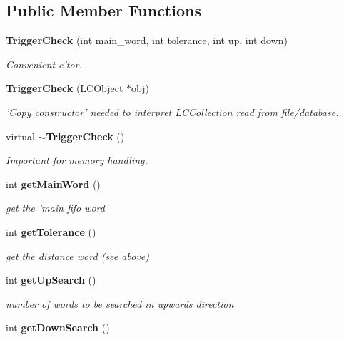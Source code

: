 \subsection*{Public Member Functions}
\begin{DoxyCompactItemize}
\item 
{\bf Trigger\-Check} (int main\-\_\-word, int tolerance, int up, int down)\label{classCALICE_1_1TriggerCheck_a5c6ad83c6479b1155434bd966137761e}

\begin{DoxyCompactList}\small\item\em Convenient c'tor. \end{DoxyCompactList}\item 
{\bf Trigger\-Check} (L\-C\-Object $\ast$obj)\label{classCALICE_1_1TriggerCheck_a212c6fc6145b9283fabe58679d934f74}

\begin{DoxyCompactList}\small\item\em 'Copy constructor' needed to interpret L\-C\-Collection read from file/database. \end{DoxyCompactList}\item 
virtual {\bf $\sim$\-Trigger\-Check} ()\label{classCALICE_1_1TriggerCheck_afcadb8b8d10fb40e64ec9656e1984e01}

\begin{DoxyCompactList}\small\item\em Important for memory handling. \end{DoxyCompactList}\item 
int {\bf get\-Main\-Word} ()\label{classCALICE_1_1TriggerCheck_a3f9131b5775e8b27f6808f0e3b93acbb}

\begin{DoxyCompactList}\small\item\em get the 'main fifo word' \end{DoxyCompactList}\item 
int {\bf get\-Tolerance} ()\label{classCALICE_1_1TriggerCheck_afc050c6e51084f4e76a20d694bc73126}

\begin{DoxyCompactList}\small\item\em get the distance word (see above) \end{DoxyCompactList}\item 
int {\bf get\-Up\-Search} ()\label{classCALICE_1_1TriggerCheck_af8a0117bed3941cb353693a7c3eface2}

\begin{DoxyCompactList}\small\item\em number of words to be searched in upwards direction \end{DoxyCompactList}\item 
int {\bf get\-Down\-Search} ()\label{classCALICE_1_1TriggerCheck_a450b5f31d4d643303621dac8a09455bf}


\end{DoxyCompactItemize}
